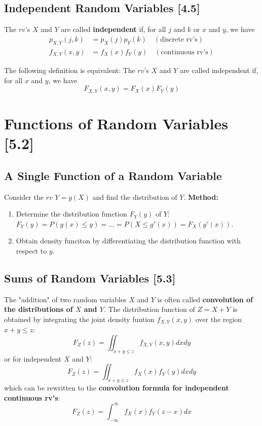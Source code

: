 \documentclass[a4paper,9pt]{extarticle}
\begin{document}
\begin{multicols*}{2}
\subsection{Independent Random Variables [4.5]}
The $rv$'s $X$ and $Y$ are called \textbf{independent} if, for all $j$ and $k$ or $x$ and $y$, we have
\begin{equation}
    \begin{split}
        p_{X,Y}(j,k) & = p_X(j) p_Y(k) \quad (\text{discrete rv's}) \\
        f_{X,Y}(x,y) & = f_X(x) f_Y(y) \quad (\text{continuous rv's})
    \end{split}
\end{equation}

The following definition is equivalent: The $rv$'s $X$ and $Y$ are called independent if, for all $x$ and $y$, we have
\begin{equation}
    F_{X,Y}(x,y) = F_X(x) F_Y(y)
\end{equation}

\section{Functions of Random Variables [5.2]}
\subsection{A Single Function of a Random Variable}
Consider the $rv$ $Y = g(X)$ and find the distribution of $Y$. \textbf{Method:}

\begin{enumerate}[label=\bfseries (\arabic*)] \itemsep0pt \parskip0pt
    \item Determine the distribution function $F_Y(y)$ of $Y$: $F_Y(y) = P(g(x) \leq y) = ... = P(X \leq g'(x)) = F_X(g'(x))$.
    \item Obtain density funciton by differentiating the distribution function with respect to $y$.
\end{enumerate}

\subsection{Sums of Random Variables [5.3]}
The "addition" of two random variables $X$ and $Y$ is often called \textbf{convolution of the distributions of $X$ and $Y$}. The distribution function of $Z = X + Y$ is obtained by integrating the joint density funtion $f_{X,Y}(x,y)$ over the region $x + y \leq z$:
\begin{equation}
    F_Z(z) = \iint_{x + y \leq z} f_{X,Y}(x,y) dx dy
\end{equation}
or for independent $X$ and $Y$:
\begin{equation}
    F_Z(z) = \iint_{x + y \leq z} f_{X}(x) f_{Y}(y) dx dy
\end{equation}
which can be rewritten to the \textbf{convolution formula for independent continuous rv's}:
\begin{equation}
    F_Z(z) = \int_{-\infty}^{\infty} f_{X}(x) f_{Y}(z - x) dx
\end{equation}


\end{multicols*}
\end{document}
